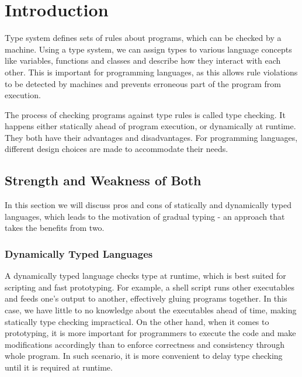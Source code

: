
\renewcommand{\thechapter}{1}

\chapter{Introduction}

Type system defines sets of rules about programs, which can be checked by a machine.
Using a type system, we can assign types to various language concepts like variables, functions and classes and describe how they interact with each other.
This is important for programming languages, as this allows rule violations
to be detected by machines and prevents erroneous part of the program from execution.

The process of checking programs against type rules is called type checking.
It happens either statically ahead of program execution, or dynamically at runtime.
They both have their advantages and disadvantages.
For programming languages, different design choices are made to
accommodate their needs.

\section{Strength and Weakness of Both}

In this section we will discuss pros and cons of
statically and dynamically typed languages,
which leads to the motivation of gradual typing - an approach that takes the benefits from two.

\subsection{Dynamically Typed Languages}

A dynamically typed language checks type at runtime, which is best suited for scripting and fast prototyping.
For example, a shell script runs other executables and feeds one's output to another, effectively gluing programs together.
In this case, we have little to no knowledge about the executables ahead of time, making statically type checking impractical.
On the other hand, when it comes to prototyping, it is more important for programmers to execute the code and make modifications accordingly
than to enforce correctness and consistency through whole program.
In such scenario, it is more convenient to delay type checking until
it is required at runtime.



